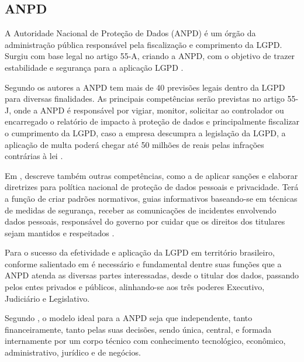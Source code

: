 \documentclass[
	12pt,				%
	openright,			%
	oneside,			%
	a4paper,			%
	english,			%
	french,				%
	spanish,			%
	brazil,				%
	]{abntex2}
\begin{document}
\subsection{ANPD}

A Autoridade Nacional de Proteção de Dados (ANPD) é um órgão da administração pública responsável pela fiscalização e comprimento da LGPD. Surgiu com base legal no artigo 55-A, criando a ANPD, com o objetivo de trazer estabilidade e segurança para a aplicação LGPD \cite{Pinheiro2021}.

Segundo os autores  a ANPD tem mais de 40 previsões legais dentro da LGPD para diversas finalidades. As principais competências serão previstas no artigo 55-J, onde a ANPD é responsável por vigiar, monitor, solicitar ao controlador ou encarregado o relatório de impacto à proteção de dados e principalmente fiscalizar o cumprimento da LGPD, caso a empresa descumpra a legislação da LGPD, a aplicação de multa poderá chegar até 50 milhões de reais pelas infrações contrárias à lei \cite{Motta}.  

Em , descreve também outras competências, como a de aplicar sanções e elaborar diretrizes para política nacional de proteção de dados pessoais e privacidade. Terá a função de criar padrões normativos, guias informativos \cite{LGPD12Magalhaes2020} baseando-se em técnicas de medidas de segurança, receber as comunicações de incidentes envolvendo dados pessoais, responsável do governo por cuidar que os direitos dos titulares sejam mantidos e respeitados \cite{Gutierrez}.

Para o sucesso da efetividade e aplicação da LGPD em território brasileiro, conforme salientado em  é necessário e fundamental dentre suas funções que a ANPD atenda as diversas partes interessadas, desde o titular dos dados, passando pelos entes privados e públicos, alinhando-se aos três poderes Executivo, Judiciário e Legislativo.

Segundo ,  o modelo ideal para a ANPD seja que independente, tanto financeiramente, tanto pelas suas decisões, sendo única, central, e formada internamente por um corpo técnico com conhecimento tecnológico, econômico, administrativo, jurídico e de negócios.
\end{document}
